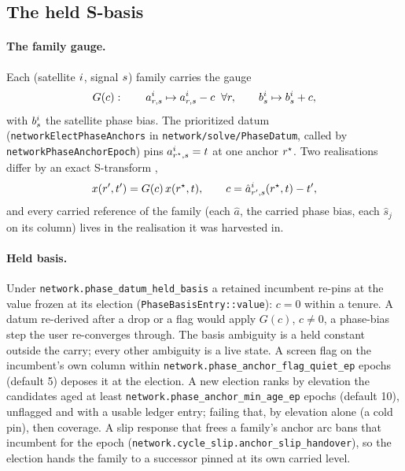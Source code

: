 \documentclass[main.tex]{subfiles}
\begin{document}
\subsection{The held S-basis}
\label{sec:net-vehicle-basis}

\paragraph{The family gauge.}
Each (satellite $i$, signal $s$) family carries the gauge
\begin{equation}
G(c):\qquad a^{i}_{r,s} \mapsto a^{i}_{r,s} - c \;\;\forall r,
\qquad b^{i}_{s} \mapsto b^{i}_{s} + c,
\label{eq:veh-gaugegroup}
\end{equation}
with $b^{i}_s$ the satellite phase bias. The prioritized datum
(\texttt{networkElectPhaseAnchors} in \texttt{network/solve/PhaseDatum},
called by \texttt{networkPhaseAnchorEpoch}) pins $a^{i}_{r^\star,s} = t$
at one anchor $r^\star$. Two realisations differ by an exact S-transform
\parencite{teunissen1985generalised},
\begin{equation}
x(r', t') = G(c)\,x(r^\star, t),
\qquad
c = \hat a^{i}_{r',s}(r^\star, t) - t' ,
\label{eq:veh-handover}
\end{equation}
and every carried reference of the family (each $\hat a$, the carried phase
bias, each $\hat s_j$ on its column) lives in the realisation it was
harvested in.

\paragraph{Held basis.}
Under \texttt{network.phase\_datum\_held\_basis} a retained incumbent
re-pins at the value frozen at its election
(\texttt{PhaseBasisEntry::value}): $c = 0$ within a tenure. A datum
re-derived after a drop or a flag would apply $G(c)$, $c \ne 0$, a
phase-bias step the user re-converges through. The basis ambiguity is
a held constant outside the carry; every other ambiguity is a live state.
A screen flag on the incumbent's own column within
\texttt{network.phase\_anchor\_flag\_quiet\_ep} epochs (default 5) deposes
it at the election. A new election ranks by elevation the candidates aged
at least \texttt{network.phase\_anchor\_min\_age\_ep} epochs (default 10),
unflagged and with a usable ledger entry; failing that, by elevation alone
(a cold pin), then coverage. A slip response that frees a family's anchor
arc bans that incumbent for the epoch
(\texttt{network.cycle\_slip.anchor\_slip\_handover}), so the election
hands the family to a successor pinned at its own carried level.
\end{document}
